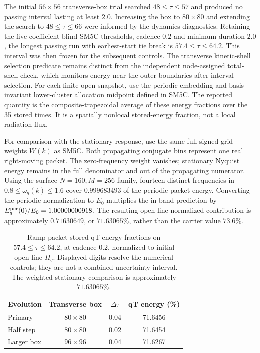 The initial $56\times56$ transverse-box trial searched $48\le\tau\le57$ and produced no passing interval lasting at least $2.0$. Increasing the box to $80\times80$ and extending the search to $48\le\tau\le66$ were informed by the dynamics diagnostics. Retaining the five coefficient-blind SM5C thresholds, cadence $0.2$ and minimum duration $2.0$, the longest passing run with earliest-start tie break is $57.4\le\tau\le64.2$. This interval was then frozen for the subsequent controls. The transverse kinetic-shell selection predicate remains distinct from the independent node-assigned total-shell check, which monitors energy near the outer boundaries after interval selection. For each finite open snapshot, use the periodic embedding and basis-invariant lower-cluster allocation midpoint defined in SM5C. The reported quantity is the composite-trapezoidal average of these energy fractions over the 35 stored times. It is a spatially nonlocal stored-energy fraction, not a local radiation flux.

For comparison with the stationary response, use the same full signed-grid weights $W(k)$ as SM5C. Both propagating conjugate bins represent one real right-moving packet. The zero-frequency weight vanishes; stationary Nyquist energy remains in the full denominator and out of the propagating numerator. Using the surface $N=160,M=256$ family, fourteen distinct frequencies in $0.8\le\omega_q(k)\le1.6$ cover $0.999683493$ of the periodic packet energy. Converting the periodic normalization to $E_0$ multiplies the in-band prediction by $E_q^{\rm per}(0)/E_0=1.00000000918$. The resulting open-line-normalized contribution is approximately $0.71630649$, or $71.63065\%$, rather than the carrier value $73.6\%$.

\begin{table}[!htbp]
 \centering
 \caption{Ramp packet stored-qT-energy fractions on $57.4\le\tau\le64.2$, at cadence $0.2$, normalized to initial open-line $H_q$. Displayed digits resolve the numerical controls; they are not a combined uncertainty interval. The weighted stationary comparison is approximately $71.63065\%$.}
 \label{tab:sm-ramp-packet-controls}
 \begin{tabular}{lccc}
  \toprule
  Evolution & Transverse box & $\Delta\tau$ & qT energy (\%)\\
  \midrule
  Primary & $80\times80$ & 0.04 & 71.6456\\
  Half step & $80\times80$ & 0.02 & 71.6454\\
  Larger box & $96\times96$ & 0.04 & 71.6267\\
  \bottomrule
 \end{tabular}
\end{table}

